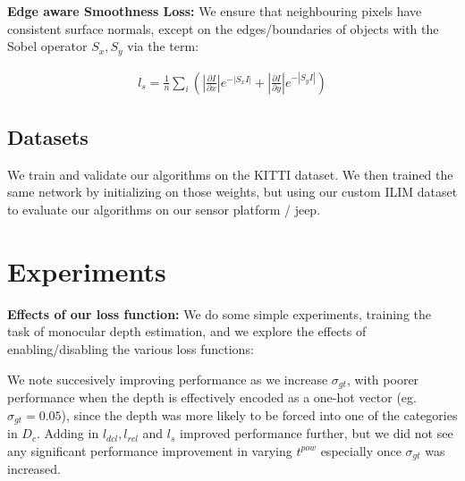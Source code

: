 \textbf{Edge aware Smoothness Loss:} We ensure that neighbouring pixels have consistent surface normals, except on the edges/boundaries of objects with the Sobel operator $S_{x}, S_{y}$ via the term:

\small
\begin{align}
    l_{s}=\frac{1}{n}\sum_{i}\left(\left|\frac{\partial I}{\partial x}\right|e^{-|S_{x}I|}+\left|\frac{\partial I}{\partial y}\right|e^{-|S_{y}I|}\right)
   \label{eq:smooth} 
\end{align}
\normalsize

\subsection{Datasets}

We train and validate our algorithms on the KITTI dataset. We then trained the same network by initializing on those weights, but using our custom ILIM dataset to evaluate our algorithms on our sensor platform / jeep.

\section{Experiments}

\textbf{Effects of our loss function:} We do some simple experiments, training the task of monocular depth estimation, and we explore the effects of enabling/disabling the various loss functions:

\noindent
\begin{table}[h]
   \centering
   \caption{Effects of various loss functions for the baseline of Monocular Depth Estimation only}
   \label{table:xx}
\end{table}

We note succesively improving performance as we increase $\sigma_{gt}$, with poorer performance when the depth is effectively encoded as a one-hot vector (eg. $\sigma_{gt}=0.05$), since the depth was more likely to be forced into one of the categories in $D_{c}$. Adding in $l_{dcl}, l_{rcl}$ and $l_{s}$ improved performance further, but we did not see any significant performance improvement in varying $t^{pow}$ especially once $\sigma_{gt}$ was increased.

